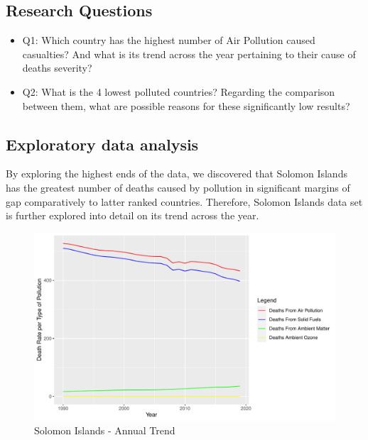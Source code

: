 \documentclass[11pt,a4paper,]{article}
\providecommand{\tightlist}{%
  \setlength{\itemsep}{0pt}\setlength{\parskip}{0pt}}
\begin{document}
\hypertarget{research-questions}{%
\subsection{Research Questions}\label{research-questions}}

\begin{itemize}
\tightlist
\item
  Q1: Which country has the highest number of Air Pollution caused casualties? And what is its trend across the year pertaining to their cause of deaths severity?
\item
  Q2: What is the 4 lowest polluted countries? Regarding the comparison between them, what are possible reasons for these significantly low results?
\end{itemize}

\hypertarget{exploratory-data-analysis-2}{%
\subsection{Exploratory data analysis}\label{exploratory-data-analysis-2}}

By exploring the highest ends of the data, we discovered that Solomon Islands has the greatest number of deaths caused by pollution in significant margins of gap comparatively to latter ranked countries. Therefore, Solomon Islands data set is further explored into detail on its trend across the year.

\begin{figure}[H]

{\centering \includegraphics[width=0.8\linewidth]{Assignment4_files/figure-latex/figure1-1} 

}

\caption{Solomon Islands - Annual Trend}\label{fig:figure1}
\end{figure}
\end{document}
